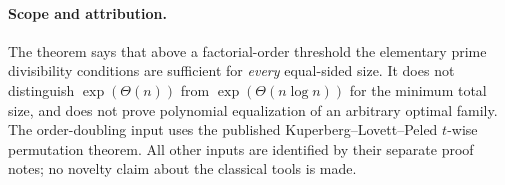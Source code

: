 \documentclass[11pt]{article}
\begin{document}
\paragraph{Scope and attribution.}
The theorem says that above a factorial-order threshold the elementary
prime divisibility conditions are sufficient for \emph{every} equal-sided
size. It does not distinguish $\exp(\Theta(n))$ from
$\exp(\Theta(n\log n))$ for the minimum total size, and does not prove
polynomial equalization of an arbitrary optimal family.
The order-doubling input uses the published Kuperberg--Lovett--Peled
$t$-wise permutation theorem. All other inputs are identified by their
separate proof notes; no novelty claim about the classical tools is made.
\end{document}
